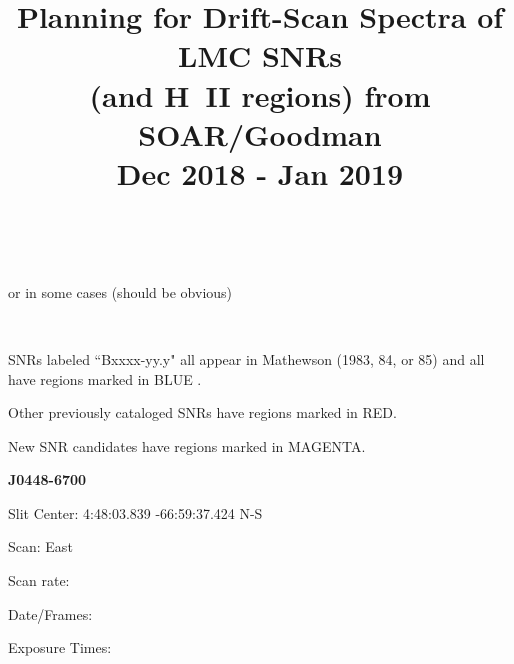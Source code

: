 \documentclass[11pt]{article}
\title{\bf Planning for Drift-Scan Spectra of LMC SNRs \\
(and H~II regions) from SOAR/Goodman \\
Dec 2018 - Jan 2019}
\date{}                                           %
\begin{document}
\maketitle
\vspace{1in}

\vspace{2 mm}
\
\vspace{1cm}

\quad\quad\quad or in some cases (should be obvious)

\vspace{0.5cm}
\vspace{2 mm}
\

\vspace{0.5cm}


\textbullet \quad SNRs labeled ``Bxxxx-yy.y" all appear in Mathewson (1983, 84, or 85) and all have regions marked in BLUE .

\textbullet \quad Other previously cataloged SNRs have regions marked in RED.

\textbullet \quad New SNR candidates have regions marked in MAGENTA.

\newpage
{\bf J0448-6700}

Slit Center:   4:48:03.839        -66:59:37.424      N-S

Scan:  East

Scan rate:  

Date/Frames:

Exposure Times:  
\end{document}
